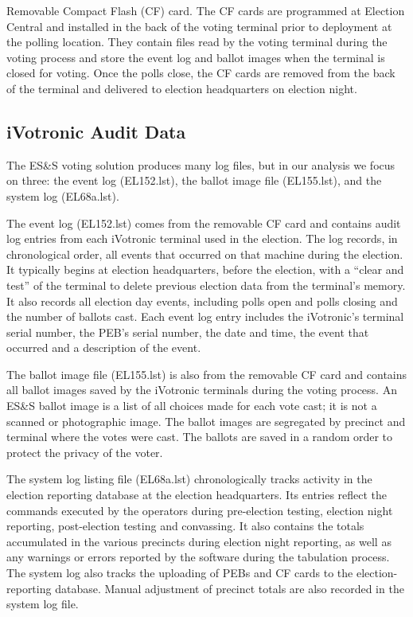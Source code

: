 \documentclass[letterpaper,twocolumn,10pt]{article}
\begin{document}
\begin{description}
\item{Removable Compact Flash (CF) card.} The CF cards are programmed at Election
  Central and installed in the back of the voting terminal prior to deployment
  at the polling location. They contain files read by the voting terminal during 
  the voting process and store the event log and ballot images when the
  terminal is closed for voting. Once the polls close, the CF cards are removed
  from the back of the terminal and delivered to election headquarters on
  election night.
\end{description}

\subsection{iVotronic Audit Data}
The ES\&S voting solution produces many log files, but in our analysis we focus
on three: the event log (EL152.lst), the ballot image file (EL155.lst), and the
system log (EL68a.lst). 

The event log (EL152.lst) comes from the removable CF card and contains audit
log entries from each iVotronic terminal used in the election. The log records,
in chronological order, all events that occurred on that machine during the
election. It typically begins at election headquarters, before the election, 
with a \textquotedblleft clear and test\textquotedblright \hspace{1 mm} of the 
terminal to delete previous election data from the terminal's memory.  It also 
records all election day events, including polls open and polls closing and 
the number of ballots cast. Each event log entry includes the iVotronic's 
terminal serial number, the PEB's serial number, the date and time, the event 
that occurred and a description of the event.

The ballot image file (EL155.lst) is also from the removable CF card and
contains all ballot images saved by the iVotronic terminals during the voting
process. An ES\&S ballot image is a list of all choices made for each vote 
cast; it is not a scanned or photographic image. The ballot images are 
segregated by precinct and terminal where the votes were cast. The ballots are 
saved in a random order to protect the privacy of the voter.

The system log listing file (EL68a.lst) chronologically tracks activity in the
election reporting database at the election headquarters. Its entries reflect 
the commands executed by the operators during pre-election testing, election 
night reporting, post-election testing and convassing.  It also contains the totals
accumulated in the various precincts during election night reporting, as well as
any warnings or errors reported by the software during the tabulation
process. The system log also tracks the uploading of PEBs and CF cards to the
election-reporting database. Manual adjustment of precinct totals are also recorded 
in the system log file.
\end{document}

